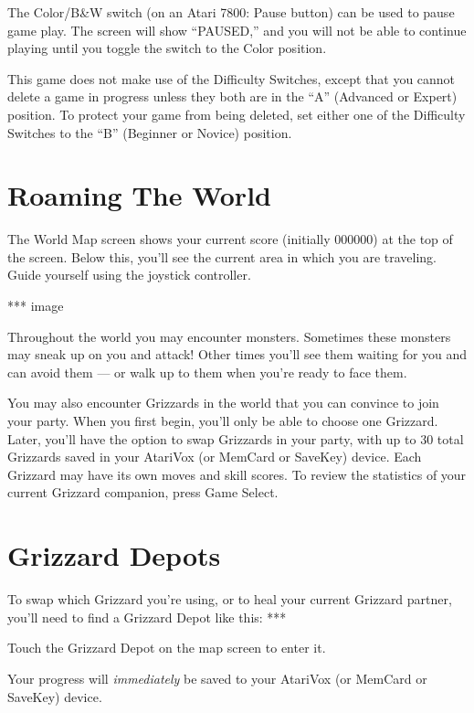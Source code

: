 \documentclass[12pt,twoside,openright,book]{memoir}
\begin{document}
\ifdefined\TVSECAM
\else

The Color/B\&W switch (on an Atari 7800: Pause button) can be used to pause
game play. The screen will show ``PAUSED,'' and you will not be able to
continue playing until you toggle the switch to the Color position.

\endif

This game does not make use  of the Difficulty Switches, except that you
cannot  delete a  game in  progress unless  they both  are in  the ``A''
(Advanced or Expert) position. To  protect your game from being deleted,
set either  one of  the Difficulty  Switches to  the ``B''  (Beginner or
Novice) position.


\section{Roaming The World}

The World Map screen shows your  current score (initially 000000) at the
top of the screen. Below this, you'll  see the current area in which you
are traveling. Guide yourself using the joystick controller.

*** image

Throughout  the  world  you  may  encounter  monsters.  Sometimes  these
monsters may  sneak up on  you and attack!  Other times you'll  see them
waiting for you  and can avoid them  --- or walk up to  them when you're
ready to face them.

You may also  encounter Grizzards in the world that  you can convince to
join your party. When you first begin, you'll only be able to choose one
Grizzard. Later, you'll have the option to swap Grizzards in your party,
with  up to  30  total Grizzards  saved in  your  AtariVox (or  MemCard or SaveKey)
device. Each Grizzard may have its own moves and skill scores. To review
the statistics of your current Grizzard companion, press Game Select.

\section{Grizzard Depots}

To swap which Grizzard you're using, or to heal your current Grizzard
partner, you'll need to find a Grizzard Depot like this: ***

Touch the Grizzard Depot on the map screen to enter it.

Your  progress will  \emph{immediately} be  saved to  your AtariVox  (or
MemCard or SaveKey) device.
\end{document}
